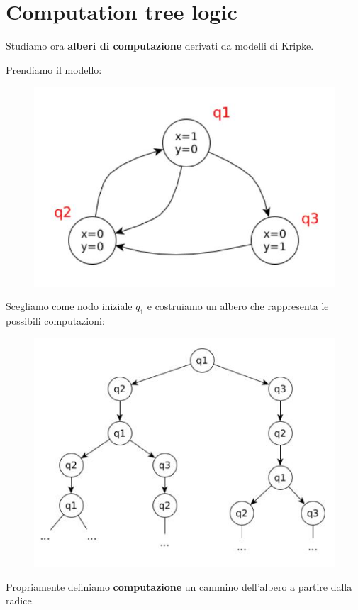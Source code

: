 \section{Computation tree logic}
Studiamo ora \textbf{alberi di computazione} derivati da modelli di Kripke.
\begin{esempio}
  Prendiamo il modello:
  \begin{figure}[H]
    \centering
    \includegraphics[scale = 0.4]{img/kri.jpg}
  \end{figure}
  Scegliamo come nodo iniziale $q_1$ e costruiamo un albero che rappresenta le
  possibili computazioni:
  \begin{figure}[H]
    \centering
    \includegraphics[scale = 0.4]{img/mc4.jpg}
  \end{figure}
\end{esempio}
\begin{definizione}
  Propriamente definiamo \textbf{computazione} un cammino dell'albero a partire
  dalla radice.
\end{definizione}
